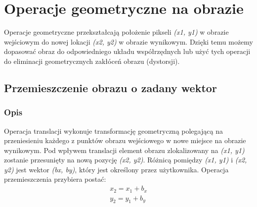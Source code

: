 \documentclass[a4paper,12pt]{book}
\begin{document}
\chapter{Operacje geometryczne na obrazie}
Operacje geometryczne przekształcają położenie pikseli \textit{(x1, y1)} w obrazie wejściowym do nowej lokacji \textit{(x2, y2)} w obrazie wynikowym. Dzięki temu możemy dopasować obraz do odpowiedniego układu współrzędnych lub użyć tych operacji do eliminacji geometrycznych zakłóceń obrazu (dystorsji). 
\section{Przemieszczenie obrazu o zadany wektor}
\subsection*{Opis}
Operacja translacji wykonuje transformację geometryczną polegającą na przeniesieniu każdego z punktów obrazu wejściowego w nowe miejsce na obrazie wynikowym. Pod wpływem translacji element obrazu zlokalizowany na \textit{(x1, y1)} zostanie przesunięty na nową pozycję \textit{(x2, y2)}. Różnicą pomiędzy \textit{(x1, y1)} i \textit{(x2, y2)} jest wektor \textit{(bx, by)}, który jest określony przez użytkownika. 
\newline
Operacja przemieszczenia przybiera postać: 
\begin{gather}
	x_2 = x_1 + b_x \\
	y_2 = y_1 + b_y
\end{gather}
\end{document}
